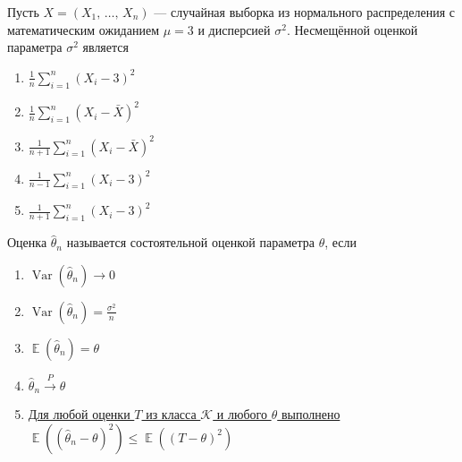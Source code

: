 \documentclass[t]{beamer}
\DeclareMathOperator{\Var}{Var}
\DeclareMathOperator{\E}{\mathbb{E}}
\begin{document}
 \begin{frame} \label{30} 
\begin{block}{30} 

  Пусть $X = (X_1, \, \ldots, \, X_n)$ — случайная выборка из нормального распределения с математическим ожиданием $\mu = 3$ и дисперсией $\sigma^2$. Несмещённой оценкой параметра $\sigma^2$ является


 \end{block} 
\begin{enumerate} 
\item[] \hyperlink{30-Yes}{\beamergotobutton{} $\frac{1}{n} \sum_{i=1}^{n}(X_i - 3)^2$}
\item[] \hyperlink{30-No}{\beamergotobutton{} $\frac{1}{n} \sum_{i=1}^{n}(X_i - \bar{X})^2$}
\item[] \hyperlink{30-No}{\beamergotobutton{} $\frac{1}{n+1} \sum_{i=1}^{n}(X_i - \bar{X})^2$}
\item[] \hyperlink{30-No}{\beamergotobutton{} $\frac{1}{n-1} \sum_{i=1}^{n}(X_i - 3)^2$}
\item[] \hyperlink{30-No}{\beamergotobutton{} $\frac{1}{n+1} \sum_{i=1}^{n}(X_i - 3)^2$}
\end{enumerate} 
\end{frame} 


 \begin{frame} \label{31} 
\begin{block}{31} 

  Оценка  $\hat\theta_n$ называется состоятельной оценкой параметра $\theta$, если


 \end{block} 
\begin{enumerate} 
\item[] \hyperlink{31-No}{\beamergotobutton{} $\Var(\hat\theta_n) \to 0$}
\item[] \hyperlink{31-No}{\beamergotobutton{} $\Var(\hat\theta_n)=\frac{\sigma^2}{n}$}
\item[] \hyperlink{31-No}{\beamergotobutton{} $\E(\hat\theta_n)=\theta$}
\item[] \hyperlink{31-Yes}{\beamergotobutton{} $\hat\theta_n \xrightarrow{P}\theta$}
\item[] \hyperlink{31-No}{\beamergotobutton{} Для любой оценки $T$ из класса $\mathcal{K}$ и любого $\theta$ выполнено $\E((\hat\theta_n-\theta)^2)\leq \E((T-\theta)^2)$}
\end{enumerate} 
\end{frame} 
\end{document}
